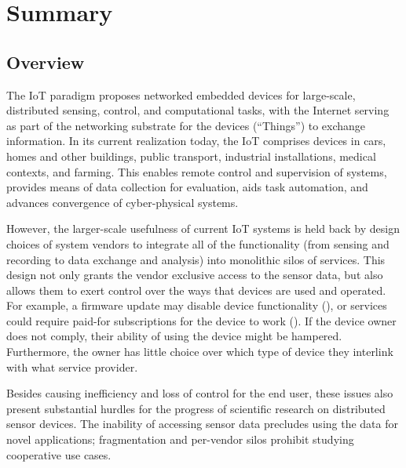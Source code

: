 
\section*{Summary}


\subsection*{Overview}


The \acrfull{IoT} paradigm proposes networked embedded devices
for large-scale, distributed sensing, control, and computational tasks,
with the Internet serving as part of the networking substrate for
the devices (``Things'') to exchange information.
In its current realization today, the \acrlong{IoT} comprises
devices in cars, homes and other buildings, public transport,
industrial installations, medical contexts, and farming.
This enables remote control and supervision of systems, provides
means of data collection for evaluation, aids
task automation, and advances convergence of cyber-physical systems.

However, the larger-scale usefulness of current \acrlong{IoT}
systems is held back by design choices of system vendors to
integrate all of the functionality (from sensing and recording
to data exchange and analysis) into monolithic silos of services.
This design not only grants the vendor exclusive access to the
sensor data, but also allows them to exert control over the ways
that devices are used and operated. For example, a firmware update
may disable device functionality (), or services could
require paid-for subscriptions for the device to work
().
If the device owner does not comply, their ability of using
the device might be hampered. Furthermore, the owner has little
choice over which type of device they interlink with what service
provider.

Besides causing inefficiency and loss of control for the end user,
these issues also present substantial hurdles for the progress
of scientific research on distributed sensor devices.
The inability of accessing sensor data precludes using the
data for novel applications; fragmentation and per-vendor silos
prohibit studying cooperative use cases.

